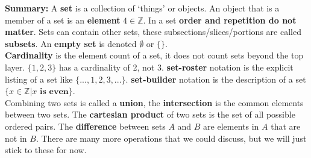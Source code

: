 \begin{greenbox}
    \begin{spacing}{1.5}
        \textbf{Summary:} A \textbf{set} is a collection of `things' or objects. An object that is a member of a set is an
        \textbf{element} $4\in\mathbb{Z}$. In a set \textbf{order and
            repetition do not matter}. Sets can contain other sets, these subsections/slices/portions are
        called \textbf{subsets}. An \textbf{empty set} is denoted $\emptyset$ or $\{\}$.\\

        \noindent
        \textbf{Cardinality} is the element
        count of a set, it does not count sets beyond the top layer. $\{1, {2, 3}\}$ has a cardinality of 2, not 3.
        \textbf{set-roster} notation is the explicit listing of a set like $\{...,1,2,3,...\}$. \textbf{set-builder}
        notation is the description of a set $\{x\in \mathbb{Z} | x \textbf{ is even}\}$.\\

        \noindent
        Combining two sets is called a \textbf{union},
        the \textbf{intersection} is the common elements between two sets. The \textbf{cartesian product} of two sets is the set of all possible
        ordered pairs. The \textbf{difference} between sets $A$ and $B$ are elements in $A$ that are not in $B$. There
        are many more operations that we could discuss, but we will just stick to these for now.
        \vspace{-1em}
    \end{spacing}
\end{greenbox}